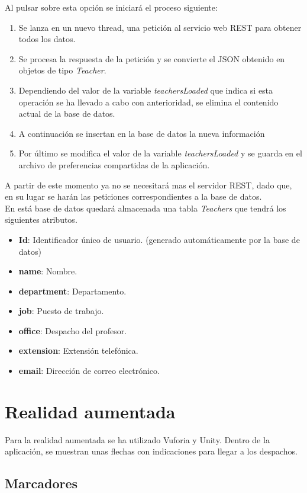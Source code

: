 \documentclass[12pt, a4paper, titlepage]{article}
\begin{document}
	Al pulsar sobre esta opción se iniciará el proceso siguiente:
	\begin{enumerate}
		\item Se lanza en un nuevo thread, una petición al servicio web REST para obtener todos los datos.
		\item Se procesa la respuesta de la petición y se convierte el JSON obtenido en objetos de tipo \textit{Teacher}.
		\item Dependiendo del valor de la variable \textit{teachersLoaded} que indica si esta operación se ha llevado a cabo con anterioridad, se elimina el contenido actual de la base de datos.
		\item A continuación se insertan en la base de datos la nueva información
		\item Por último se modifica el valor de la variable \textit{teachersLoaded} y se guarda en el archivo de preferencias compartidas de la aplicación.
	\end{enumerate}	
	
	A partir de este momento ya no se necesitará mas el servidor REST, dado que, en su lugar se harán las peticiones correspondientes a la base de datos.\\
	En está base de datos quedará almacenada una tabla \textit{Teachers} que tendrá los siguientes atributos.
	\begin{itemize}
		\item \textbf{Id}: Identificador único de usuario. (generado automáticamente por la base de datos)
		\item \textbf{name}: Nombre. 
		\item \textbf{department}: Departamento.
		\item  \textbf{job}: Puesto de trabajo.
		\item \textbf{office}: Despacho del profesor.
		\item \textbf{extension}: Extensión telefónica.
		\item \textbf{email}: Dirección de correo electrónico.
	\end{itemize}
	
	\clearpage
\section{Realidad aumentada}
Para la realidad aumentada se ha utilizado Vuforia y Unity. Dentro de la aplicación, se muestran unas flechas con indicaciones para llegar a los despachos.

\subsection{Marcadores}
\end{document}
